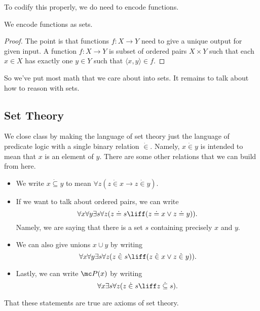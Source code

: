 \documentclass[../notes.tex]{subfiles}
\begin{document}
To codify this properly, we do need to encode functions.
\begin{exe}
	We encode functions as sets.
\end{exe}
\begin{proof}
	The point is that functions $f\colon X\to Y$ need to give a unique output for given input. A function $f\colon X\to Y$ is subset of ordered pairs $X\times Y$ such that each $x\in X$ has exactly one $y\in Y$ such that $\langle x,y\rangle\in f$.
\end{proof}
So we've put most math that we care about into sets. It remains to talk about how to reason with sets.

\subsection{Set Theory}
We close class by making the language of set theory just the language of predicate logic with a single binary relation $\dot{{}\in{}}$. Namely, $x\dot{{}\in{}} y$ is intended to mean that $x$ is an element of $y$. There are some other relations that we can build from here.
\begin{itemize}
	\item We write $x\dot{{}\subseteq{}} y$ to mean $\forall z(z\dot{{}\in{}} x\to z\dot{{}\in{}} y)$.
	\item If we want to talk about ordered pairs, we can write
	\[\forall x\forall y\exists s\forall z(z\doteq s\liff(z\doteq x\lor z\doteq y)).\]
	Namely, we are saying that there is a set $s$ containing precisely $x$ and $y$.
	\item We can also give unions $x\cup y$ by writing
	\[\forall x\forall y\exists s\forall z(z\dot{{}\in{}} s\liff(z\dot{{}\in{}} x\lor z\dot{{}\in{}} y)).\]
	\item Lastly, we can write $\mc P(x)$ by writing
	\[\forall x\exists s\forall z(z\dot{{}\in{}} s\liff z\dot{{}\subseteq{}} s).\]
\end{itemize}
That these statements are true are axioms of set theory.
\end{document}

